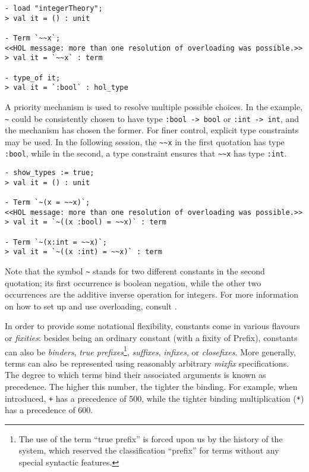 {\setcounter{sessioncount}{1}
\begin{session}
\begin{verbatim}
- load "integerTheory";
> val it = () : unit

- Term `~~x`;
<<HOL message: more than one resolution of overloading was possible.>>
> val it = `~~x` : term

- type_of it;
> val it = `:bool` : hol_type
\end{verbatim}
\end{session}

A priority mechanism is used to resolve multiple possible choices. In
the example, {\small\verb+~+} could be consistently chosen to have type
{\small\verb+:bool -> bool+} or {\small\verb+:int -> int+}, and the
mechanism has chosen the former. For finer control, explicit type
constraints may be used. In the following session, the
{\small\verb+~~x+} in the first quotation has type {\small\verb+:bool+},
while in the second, a type constraint ensures that {\small\verb+~~x+} has
type {\small\verb+:int+}.

\begin{session}
\begin{verbatim}
- show_types := true;
> val it = () : unit

- Term `~(x = ~~x)`;
<<HOL message: more than one resolution of overloading was possible.>>
> val it = `~((x :bool) = ~~x)` : term

- Term `~(x:int = ~~x)`;
> val it = `~((x :int) = ~~x)` : term
\end{verbatim}
\end{session}

Note that the symbol {\small\verb+~+} stands for two different constants in
the second quotation; its first occurrence is boolean negation, while
the other two occurrences are the additive inverse operation for integers.
For more information on how to set up and use overloading, consult
\REFERENCE.

In order to provide some notational flexibility, constants come in
various flavours or {\it fixities}: besides being an ordinary constant
(with a fixity of {\sf Prefix}), constants can also be {\it binders},
{\it true prefixes}\footnote{The use of the term ``true prefix'' is
forced upon us by the history of the system, which reserved the
classification ``prefix'' for terms without any special syntactic
features.}, {\it suffixes}, {\it infixes}, or {\it closefixes}.  More
generally, terms can also be represented using reasonably arbitrary
{\it mixfix} specifications.  The degree to which terms bind their
associated arguments is known as precedence.  The higher this number,
the tighter the binding.  For example, when introduced, \verb-+- has a
precedence of 500, while the tighter binding multiplication (\verb+*+)
has a precedence of 600.

}
